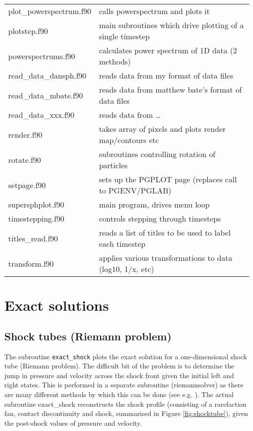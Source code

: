 \documentclass[a4paper,12pt]{article}
\begin{document}
\begin{longtable}{|lp{}|}
     plot\_powerspectrum.f90 & calls powerspectrum and plots it\\
     plotstep.f90           & main subroutines which drive plotting of a single timestep\\
     powerspectrums.f90     & calculates power spectrum of 1D data (2 methods)\\
     read\_data\_dansph.f90   & reads data from my format of data files\\
     read\_data\_mbate.f90    & reads data from matthew bate's format of data files\\
     read\_data\_xxx.f90 & reads data from \ldots \\ 
     render.f90	 	 & takes array of pixels and plots render map/contours etc\\
     rotate.f90             & subroutines controlling rotation of particles\\
     setpage.f90            & sets up the PGPLOT page (replaces call to PGENV/PGLAB)\\
     supersphplot.f90	 & main program, drives menu loop\\
     timestepping.f90       & controls stepping through timesteps\\
     titles\_read.f90        & reads a list of titles to be used to label each timestep\\
     transform.f90	 	 & applies various transformations to data (log10, 1/x, etc) \\
\end{longtable}

\section{Exact solutions}
\label{sec:exact}
\subsection{Shock tubes (Riemann problem)}
 The subroutine \verb+exact_shock+ plots the exact solution for a one-dimensional shock tube
(Riemann problem). The difficult bit of the problem is to determine the jump in
pressure and velocity across the shock front given the initial left and right
states. This is performed in a separate subroutine (riemannsolver) as there are 
many different methods by which this can be done (see e.g. \citealt{toro92}). 
The actual subroutine exact\_shock reconstructs the shock profile (consisting of
a rarefaction fan, contact discontinuity and shock, summarised in Figure
\ref{fig:shocktube}), given the post-shock values of pressure and
velocity. 
\end{document}
